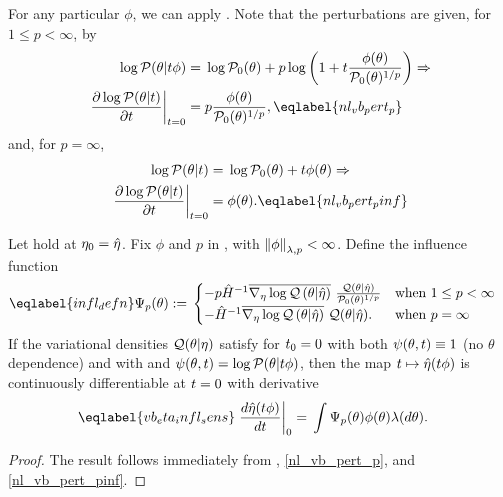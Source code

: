 



For any particular $\phi$, we can apply .  Note that the
perturbations are given, for $1 \le p < \infty$, by
%
\begin{align}
%
\logp(\theta \vert \t \phi) ={}&
   \log \pbase(\theta) +
       p \log\left(1 + \t \frac{\phi(\theta)}{\pbase(\theta)^{1/p}}\right)
\Rightarrow \nonumber\\
\fracat{\partial \log \p(\theta \vert \t)}{\partial \t}{\t=0} ={}&
   p \frac{\phi(\theta)}{\pbase(\theta)^{1/p}},
   \eqlabel{nl_vb_pert_p}
%
\end{align}
%
and, for $p = \infty$,
%
\begin{align}
%
\logp(\theta \vert \t) ={}&
   \log \pbase(\theta) + \t \phi(\theta)
\Rightarrow \nonumber\\
\fracat{\partial \log \p(\theta \vert \t)}{\partial \t}{\t=0} ={}&
   \phi(\theta).
\eqlabel{nl_vb_pert_pinf}
%
\end{align}



\begin{cor}
%
Let  hold at $\eta_0 = \hat\eta$.
%
Fix $\phi$ and $p$ in , with $\left\Vert\phi\right\Vert_{\lambda,p} <
\infty$.  Define the influence function
%
\begin{align}\eqlabel{infl_defn}
%
\infl_p(\theta) :={}&
\begin{cases}
    - p \hessopt^{-1}
        \lqgradbar{\theta \vert \etaopt}
        \frac{\q(\theta \vert \etaopt)}{\pbase(\theta)^{1/p}}
& \textrm{when }1 \le p < \infty \\
%
    - \hessopt^{-1}
        \lqgradbar{\theta \vert \etaopt}
        \q(\theta \vert \etaopt).
& \textrm{when }p = \infty
%
\end{cases}
%
\end{align}
%
If the variational densities $\mathcal{Q}(\theta \vert \eta)$ satisfy
 for $t_0 = 0$ with both $\psi(\theta, t) \equiv 1$ (no
$\theta$ dependence) and with and $\psi(\theta, t) = \log \mathcal{P}(\theta \vert t
\phi)$, then the map $t \mapsto \hat\eta(t \phi)$ is continuously
differentiable at $t=0$ with derivative
%
\begin{align}\eqlabel{vb_eta_infl_sens}
%
\fracat{d \etaopt(\t \phi)}{d \t}{0} ={}&
    \int \infl_p(\theta) \phi(\theta) \lambda(d\theta).
%
\end{align}
%
\begin{proof}
%
The result follows immediately from , \eqref{nl_vb_pert_p},
and \eqref{nl_vb_pert_pinf}.
%
\end{proof}
%
\end{cor}

